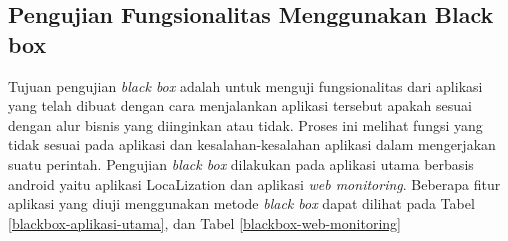 \subsection{Pengujian Fungsionalitas Menggunakan Black box}
\par Tujuan pengujian \textit{black box} adalah untuk menguji fungsionalitas dari aplikasi yang telah dibuat dengan cara menjalankan aplikasi tersebut apakah sesuai dengan alur bisnis yang diinginkan atau tidak. Proses ini melihat fungsi yang tidak sesuai pada aplikasi dan kesalahan-kesalahan aplikasi dalam mengerjakan suatu perintah. Pengujian \textit{black box} dilakukan pada aplikasi utama berbasis android yaitu aplikasi LocaLization dan aplikasi \textit{web monitoring}. Beberapa fitur aplikasi yang diuji menggunakan metode \textit{black box} dapat dilihat pada Tabel \ref{blackbox-aplikasi-utama}, dan Tabel \ref{blackbox-web-monitoring}


